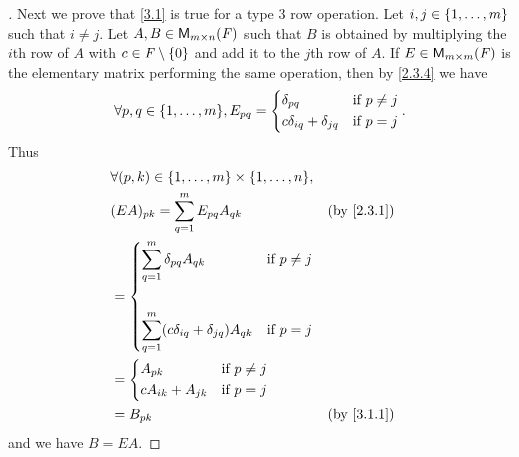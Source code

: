 \begin{proof}[]
	Next we prove that \cref{3.1} is true for a type 3 row operation.
	Let \(i, j \in \left\lbrace1, \dots, m\right\rbrace\) such that \(i \neq j\).
	Let \(A, B \in \mathsf{M}_{{m} \times n}({\mathit{F}})\) such that \(B\) is obtained by multiplying the \(i\)th row of \(A\) with \(c \in \mathit{F} \setminus \left\lbrace0\right\rbrace\) and add it to the \(j\)th row of \(A\).
	If \(E \in \mathsf{M}_{{m} \times m}({\mathit{F}})\) is the elementary matrix performing the same operation, then by \cref{2.3.4} we have
	\[
		\forall p, q \in \set{1, \dots, m}, E_{p q} = \begin{dcases}
			\delta_{p q}                  & \text{if } p \neq j \\
			c \delta_{i q} + \delta_{j q} & \text{if } p = j
		\end{dcases}.
	\]
	Thus
	\begin{align*}
		 & \forall (p, k) \in \set{1, \dots, m} \times \set{1, \dots, n},                                                        \\
		 & (EA)_{p k} = \sum_{q = 1}^m E_{p q} A_{q k}                                                           &  & \by{2.3.1} \\
		 & = \begin{dcases}
			     \sum_{q = 1}^m \delta_{p q} A_{q k}                    & \text{if } p \neq j \\                    \\
			     \sum_{q = 1}^m (c \delta_{i q} + \delta_{j q}) A_{q k} & \text{if } p = j
		     \end{dcases}                  \\
		 & = \begin{dcases}
			     A_{p k}             & \text{if } p \neq j \\
			     c A_{i k} + A_{j k} & \text{if } p = j
		     \end{dcases}                                                                           \\
		 & = B_{p k}                                                                                             &  & \by{3.1.1}
	\end{align*}
	and we have \(B = EA\).


\end{proof}
